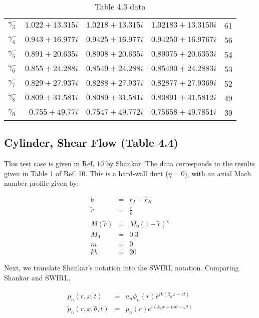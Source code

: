 \begin{table}
\begin{tabular}{c | r | r | r | r}
 $\gamma_3^{-}$ & $ 1.022 + 13.315 i $ & $ 1.0218 + 13.315 i$ & $ 1.02183  + 13.3150 i$ & 61  \\
 $\gamma_4^{-}$ & $ 0.943 + 16.977 i $ & $ 0.9425 + 16.977 i$ & $ 0.94250  + 16.9767 i$ & 56  \\
 $\gamma_5^{-}$ & $ 0.891 + 20.635 i $ & $ 0.8908 + 20.635 i$ & $ 0.89075  + 20.6353 i$ & 54  \\
 $\gamma_6^{-}$ & $ 0.855 + 24.288 i $ & $ 0.8549 + 24.288 i$ & $ 0.85490  + 24.2883 i$ & 53  \\
 $\gamma_7^{-}$ & $ 0.829 + 27.937 i $ & $ 0.8288 + 27.937 i$ & $ 0.82877  + 27.9369 i$ & 52  \\
 $\gamma_8^{-}$ & $ 0.809 + 31.581 i $ & $ 0.8089 + 31.581 i$ & $ 0.80891  + 31.5812 i$ & 49  \\
 $\gamma_9^{-}$ & $ 0.755 + 49.77  i $ & $ 0.7547 + 49.772 i$ & $ 0.75658  + 49.7851 i$ & 39  \\ \hline
 \end{tabular}
 \caption{Table 4.3 data}
 \label{Table43}
\end{table}

\subsection{Cylinder, Shear Flow (Table 4.4)}

This test case is given in Ref. 10 by Shankar.  The data corresponds to the results
given in Table 1 of Ref. 10.  This is a hard-wall duct ($\eta = 0$), with an axial
Mach number profile given by:

\begin{eqnarray}
b &=& r_T - r_H
\nonumber
\\
\widetilde{r} &=& \frac{r}{b}
\nonumber
\\
M \left(\widetilde{r} \right)
&=&
M_0 \left(1 - \widetilde{r} \right)^{\frac{1}{7}}
\nonumber
\\
M_0 &=& 0.3
\nonumber
\\
m &=& 0
\nonumber
\\
kb &=& 20
\nonumber
\end{eqnarray}

Next, we translate Shankar's notation into the SWIRL notation.  Comparing
Shankar and SWIRL,

\begin{eqnarray}
p_n \left(r, x, t \right)
&=&
a_n \phi_n \left( r \right)
e^{i k \left(\beta_n x - c t \right)}
\nonumber
\\
\widetilde{p}_n \left(r, x, \theta, t \right)
&=&
p_n \left(r \right) e^{i \left(k_x x + m \theta - \omega t \right)}
\nonumber
\end{eqnarray}

